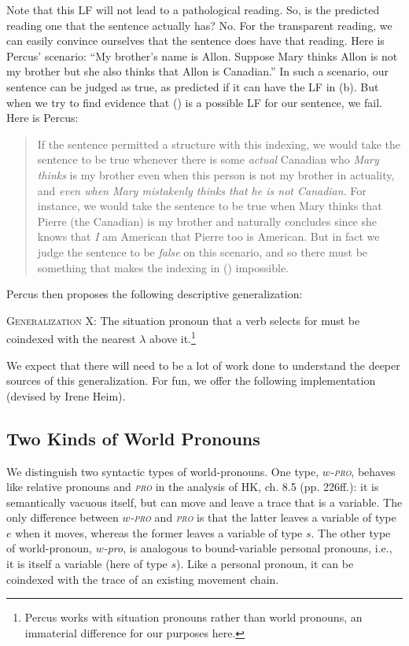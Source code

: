 Note that this LF will not lead to a pathological reading. So, is the predicted reading one that the sentence actually has? No. For the transparent reading, we can easily convince ourselves that the sentence does have that reading. Here is Percus' scenario: ``My brother's name is Allon. Suppose Mary thinks Allon is not my brother but she also thinks that Allon is Canadian.'' In such a scenario, our sentence can be judged as true, as predicted if it can have the LF in (\blastx b). But when we try to find evidence that (\lastx) is a possible LF for our sentence, we fail. Here is Percus:

\begin{quote}
  If the sentence permitted a structure with this indexing, we would take the sentence to be true whenever there is some \emph{actual} Canadian who \emph{Mary thinks} is my brother \dash even when this person is not my brother in actuality, and \emph{even when Mary mistakenly thinks that he is not Canadian}. For instance, we would take the sentence to be true when Mary thinks that Pierre (the Canadian) is my brother and naturally concludes \dash since she knows that \emph{I} am American \dash that Pierre too is American. But in fact we judge the sentence to be \emph{false} on this scenario, and so there must be something that makes the indexing in (\lastx) impossible. 
\end{quote}
%
Percus then proposes the following descriptive generalization:

\ex \textsc{Generalization X}: The situation pronoun that a verb selects for must be coindexed with the nearest $\lambda$ above it.\footnote{Percus works with situation pronouns rather than world pronouns, an immaterial difference for our purposes here.} \xe

We expect that there will need to be a lot of work done to understand the deeper sources of this generalization. For fun, we offer the following implementation (devised by Irene Heim).

\subsection{Two Kinds of World Pronouns}

We distinguish two syntactic types of world-pronouns. One type, \emph{$w$-\textsc{pro}}, behaves like relative pronouns and \emph{\textsc{pro}} in the analysis of H\amp K, ch. 8.5 (pp. 226ff.): it is semantically vacuous itself, but can move and leave a trace that is a variable. The only difference between \emph{$w$-\textsc{pro}} and \emph{\textsc{pro}} is that the latter leaves a variable of type $e$ when it moves, whereas the former leaves a variable of type $s$. The other type of world-pronoun, \emph{$w$-pro}, is analogous to bound-variable personal pronouns, i.e., it is itself a variable (here of type $s$). Like a personal pronoun, it can be coindexed with the trace of an existing movement chain.

